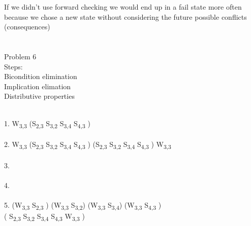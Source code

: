 \documentclass{article}
\let\biconditional\leftrightarrow
\begin{document}
If we didn't use forward checking we would end up in a fail state more often because we
chose a new state without considering the future possible conflicts (consequences)
\\
\\
\\
Problem 6 \\
Steps: \\
Bicondition elimination \\
Implication elimation \\
Distributive properties \\
\\
\begin{p6}
1. W\textsubscript{3,3} \biconditional \big(S\textsubscript{2,3} \land S\textsubscript{3,2} \land S\textsubscript{3,4} \land S\textsubscript{4,3} \big)\\
\\
2. W\textsubscript{3,3} \to \big(S\textsubscript{2,3} \land S\textsubscript{3,2} \land S\textsubscript{3,4} \land S\textsubscript{4,3} ) \land (S\textsubscript{2,3} \land S\textsubscript{3,2} \land S\textsubscript{3,4} \land S\textsubscript{4,3} \big) \to W\textsubscript{3,3} \\
\\
3.  \land {} \\
\\
4.  \land {} \\
\\
5. \big(\neg W\textsubscript{3,3} \lor S\textsubscript{2,3} \big) \land \big(\neg W\textsubscript{3,3} \lor S\textsubscript{3,2}\big) \land \big(\neg W\textsubscript{3,3} \lor S\textsubscript{3,4}\big) \land  \big(\neg W\textsubscript{3,3} \lor S\textsubscript{4,3} \big) \\ \land( \neg S\textsubscript{2,3} \lor \neg S\textsubscript{3,2} \lor \neg S\textsubscript{3,4} \lor \neg S\textsubscript{4,3} \lor W\textsubscript{3,3} \big)
\end{p6}
\end{document}
